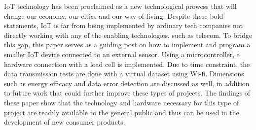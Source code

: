 IoT technology has been proclaimed as a new technological prowess that will change our economy, our cities and our way of living. Despite these bold statements, IoT is far from being implemented by ordinary tech companies not directly working with any of the enabling technologies, such as telecom. To bridge this gap, this paper serves as a guiding post on how to implement and program a smaller IoT device connected to an external sensor. Using a microcontroller, a hardware connection with a load cell is implemented. Due to time constraint, the data transmission tests are done with a virtual dataset using Wi-fi. Dimensions such as energy efficacy and data error detection are discussed as well, in addition to future work that could further improve these types of projects. The findings of these paper show that the technology and hardware necessary for this type of project are readily available to the general public and thus can be used in the development of new consumer products.



